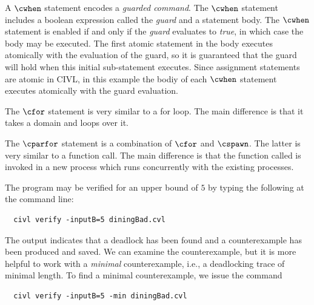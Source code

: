 A $\cwhen$ statement encodes a \emph{guarded command}. The $\cwhen$
statement includes a boolean expression called the \emph{guard} and a
statement body. The $\cwhen$ statement is enabled if and only if the
\emph{guard} evaluates to \emph{true}, in which case the body may be
executed. The first atomic statement in the body executes atomically
with the evaluation of the guard, so it is guaranteed that the guard
will hold when this initial sub-statement executes. Since assignment
statements are atomic in CIVL, in this example the bodiy of each
$\cwhen$ statement executes atomically with the guard evaluation.

The $\cfor$ statement is very similar to a for loop. The main
difference is that it takes a domain and loops over it.

The $\cparfor$ statement is a combination of $\cfor$ and $\cspawn$. 
The latter is very similar to a function call. The main
difference is that the function called is invoked in a new process
which runs concurrently with the existing processes. 

The program may be verified for an upper bound of $5$ by typing the
following at the command line:
\begin{verbatim}
  civl verify -inputB=5 diningBad.cvl
\end{verbatim}

The output indicates that a deadlock has been found and a
counterexample has been produced and saved. We can examine the
counterexample, but it is more helpful to work with a \emph{minimal}
counterexample, i.e., a deadlocking trace of minimal length. To find a
minimal counterexample, we issue the command

\begin{verbatim}
  civl verify -inputB=5 -min diningBad.cvl
\end{verbatim}

